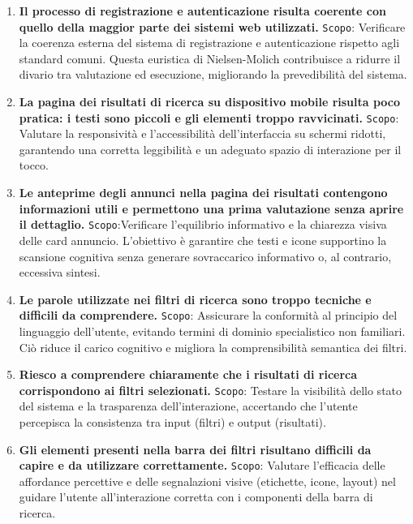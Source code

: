 \begin{enumerate}
	\item \textbf{Il processo di registrazione e autenticazione risulta coerente con quello della maggior parte dei sistemi web utilizzati.}
	\newline
	\texttt{Scopo}: Verificare la coerenza esterna del sistema di registrazione e autenticazione rispetto agli standard comuni. Questa euristica di Nielsen-Molich contribuisce a ridurre il divario tra valutazione ed esecuzione, migliorando la prevedibilità del sistema.
	
	\item \textbf{La pagina dei risultati di ricerca su dispositivo mobile risulta poco pratica: i testi sono piccoli e gli elementi troppo ravvicinati.}
	\newline
	\texttt{Scopo}: Valutare la responsività e l’accessibilità dell’interfaccia su schermi ridotti, garantendo una corretta leggibilità e un adeguato spazio di interazione per il tocco.
	
	\item \textbf{Le anteprime degli annunci nella pagina dei risultati contengono informazioni utili e permettono una prima valutazione senza aprire il dettaglio.}
	\newline
	\texttt{Scopo}:Verificare l’equilibrio informativo e la chiarezza visiva delle card annuncio. L’obiettivo è garantire che testi e icone supportino la scansione cognitiva senza generare sovraccarico informativo o, al contrario, eccessiva sintesi.
	
	\item \textbf{Le parole utilizzate nei filtri di ricerca sono troppo tecniche e difficili da comprendere.}
	\newline
	\texttt{Scopo}: Assicurare la conformità al principio del linguaggio dell’utente, evitando termini di dominio specialistico non familiari. Ciò riduce il carico cognitivo e migliora la comprensibilità semantica dei filtri.
	
	\item \textbf{Riesco a comprendere chiaramente che i risultati di ricerca corrispondono ai filtri selezionati.}
	\newline
	\texttt{Scopo}: Testare la visibilità dello stato del sistema e la trasparenza dell’interazione, accertando che l’utente percepisca la consistenza tra input (filtri) e output (risultati).
	
	\item \textbf{Gli elementi presenti nella barra dei filtri risultano difficili da capire e da utilizzare correttamente.}
	\newline
	\texttt{Scopo}: Valutare l’efficacia delle affordance percettive e delle segnalazioni visive (etichette, icone, layout) nel guidare l’utente all’interazione corretta con i componenti della barra di ricerca.
	

\end{enumerate}
